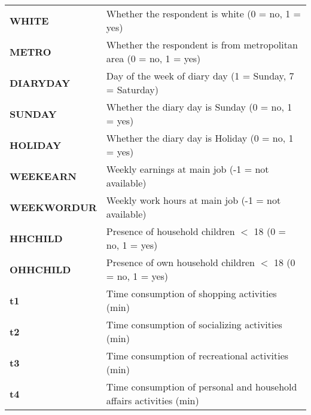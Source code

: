 \documentclass[12pt,a4paper]{article}
\begin{document}
\begin{longtable}{|p{}|p{}|}
\textbf{WHITE} &

Whether the respondent is white (0 = no, 1 = yes) \\

\textbf{METRO} &

Whether the respondent is from metropolitan area (0 = no, 1 = yes) \\

\textbf{DIARYDAY} &

Day of the week of diary day (1 = Sunday, 7 = Saturday) \\

\textbf{SUNDAY} &

Whether the diary day is Sunday (0 = no, 1 = yes) \\

\textbf{HOLIDAY} &

Whether the diary day is Holiday (0 = no, 1 = yes) \\

\textbf{WEEKEARN} &

Weekly earnings at main job (-1 = not available) \\

\textbf{WEEKWORDUR} &

Weekly work hours at main job (-1 = not available) \\

\textbf{HHCHILD} &

Presence of household children $<$ 18 (0 = no, 1 = yes) \\

\textbf{OHHCHILD} &

Presence of own household children $<$ 18 (0 = no, 1 = yes) \\

\textbf{t1} &

Time consumption of shopping activities (min) \\

\textbf{t2} &

Time consumption of socializing activities (min) \\

\textbf{t3} &

Time consumption of recreational activities (min) \\

\textbf{t4} &

Time consumption of personal and household affairs activities (min) \\

\end{longtable}
\end{document}
